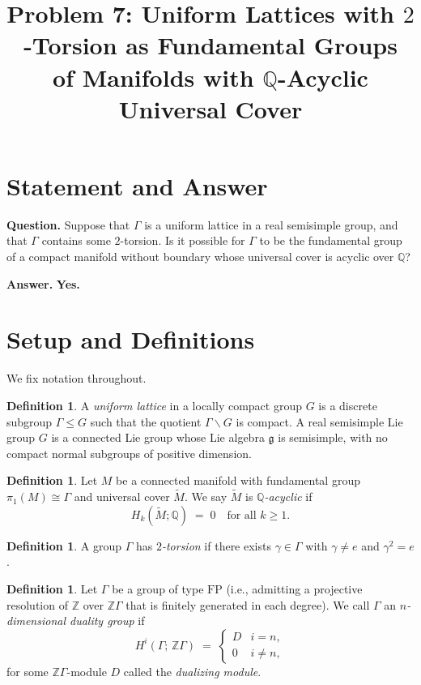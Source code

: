 \documentclass[12pt]{article}
\title{Problem 7: Uniform Lattices with $2$-Torsion as Fundamental Groups\\
of Manifolds with $\mathbb{Q}$-Acyclic Universal Cover}
\author{}
\date{}
\theoremstyle{definition}
\newtheorem{definition}[theorem]{Definition}
\begin{document}
\maketitle

\section*{Statement and Answer}

\noindent\textbf{Question.}
Suppose that $\Gamma$ is a uniform lattice in a real semisimple group, and that $\Gamma$
contains some $2$-torsion.  Is it possible for $\Gamma$ to be the fundamental group of
a compact manifold without boundary whose universal cover is acyclic over $\mathbb{Q}$?

\medskip
\noindent\textbf{Answer.}  \textbf{Yes.}

\section{Setup and Definitions}

We fix notation throughout.

\begin{definition}
A \emph{uniform lattice} in a locally compact group $G$ is a discrete subgroup
$\Gamma \leq G$ such that the quotient $\Gamma\backslash G$ is compact.  A real semisimple Lie group
$G$ is a connected Lie group whose Lie algebra $\mathfrak{g}$ is semisimple, with no compact
normal subgroups of positive dimension.
\end{definition}

\begin{definition}
Let $M$ be a connected manifold with fundamental group $\pi_1(M) \cong \Gamma$ and
universal cover $\widetilde{M}$.  We say $\widetilde{M}$ is \emph{$\mathbb{Q}$-acyclic} if
\[
  H_k(\widetilde{M};\mathbb{Q}) \;=\; 0 \quad \text{for all } k \geq 1.
\]
\end{definition}

\begin{definition}
A group $\Gamma$ has \emph{$2$-torsion} if there exists $\gamma \in \Gamma$
with $\gamma \neq e$ and $\gamma^{2} = e$.
\end{definition}

\begin{definition}
Let $\Gamma$ be a group of type $\mathrm{FP}$ (i.e., admitting a projective resolution of
$\mathbb{Z}$ over $\mathbb{Z}\Gamma$ that is finitely generated in each degree).  We call
$\Gamma$ an \emph{$n$-dimensional duality group} if
\[
  H^{i}(\Gamma;\,\mathbb{Z}\Gamma) \;=\;
  \begin{cases} D & i = n, \\ 0 & i \neq n,\end{cases}
\]
for some $\mathbb{Z}\Gamma$-module $D$ called the \emph{dualizing module}.
\end{definition}
\end{document}
